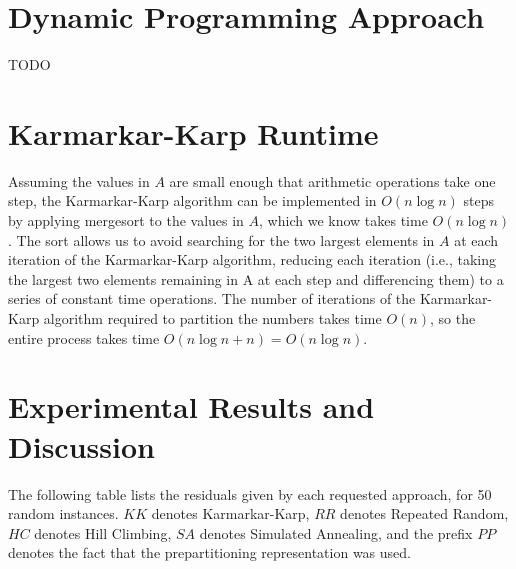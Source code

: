 \documentclass[solution, letterpaper]{cs121}
\begin{document}

\section*{Dynamic Programming Approach}
TODO


\section*{Karmarkar-Karp Runtime}
\hspace{4mm} Assuming the values in $A$ are small enough that arithmetic operations take one step, the Karmarkar-Karp algorithm can be implemented in $O(n \log n)$ steps by applying mergesort to the values in $A$, which we know takes time $O(n \log n)$. The sort allows us to avoid searching for the two largest elements in $A$ at each iteration of the Karmarkar-Karp algorithm, reducing each iteration (i.e., taking the largest two elements remaining in A at each step and differencing them) to a series of constant time operations. The number of iterations of the Karmarkar-Karp algorithm required to partition the numbers takes time $O(n)$, so the entire process takes time $O(n \log n + n) = O(n \log n)$.


\section*{Experimental Results and Discussion}
\hspace{4mm} The following table lists the residuals given by each requested approach, for 50 random instances. $KK$ denotes Karmarkar-Karp, $RR$ denotes Repeated Random, $HC$ denotes Hill Climbing, $SA$ denotes Simulated Annealing, and the prefix $PP$ denotes the fact that the prepartitioning representation was used.
\end{document}
